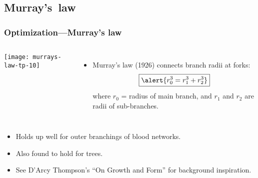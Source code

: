 \subsection{Murray's\ law}

\begin{frame}
  \frametitle{Optimization---Murray's law}

  \begin{columns}
    \texttt{[image: murrays-law-tp-10]}
    \begin{itemize}
    \item<1-> Murray's law (1926) connects branch radii at forks:\cite{murray1926a,murray1926b,murray1927a,labarbera1990a,thompson1961a}
      $$ \boxed{ \alert{r_0^{3} = r_1^{3} + r_2^{3}}} $$
      where $r_0$ = radius of main branch,
      and $r_1$ and $r_2$ are radii of sub-branches.
    \end{itemize}
  \end{columns}
    \begin{itemize}
    \item<2-> Holds up well for outer branchings of blood networks.
    \item<3-> Also found to hold for trees\cite{murray1927a,mcculloh2003a,mcculloh2004a}.
    \item<4-> See D'Arcy Thompson's ``On Growth and Form'' for background inspiration\cite{thompson1952a,thompson1961a}.
    \end{itemize}

\end{frame}



